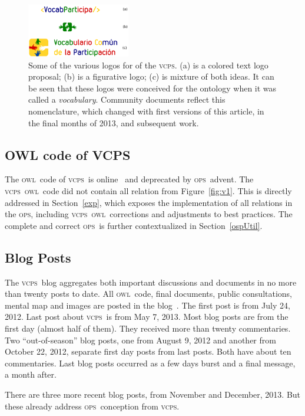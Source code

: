 \documentclass[10pt,letterpaper]{article}
\newcommand{\ops}{\textsc{ops}}
\newcommand{\vcps}{\textsc{vcps}}
\newcommand{\owl}{\textsc{owl}}
\begin{document}
\begin{figure}[!h]
    \centering
    \includegraphics[width=0.4\textwidth]{figs/logoUnificadoDoPDF}
    \caption{Some of the various logos for of the \vcps.
    (a) is a colored text logo proposal; (b) is a figurative logo; (c) is mixture of both ideas.
    It can be seen that these logos were conceived for the ontology when it was called a \emph{vocabulary}.
    Community documents reflect this nomenclature, which changed with first versions of this article,
    in the final months of 2013, and subsequent work.}
    \label{logo}
\end{figure}

\subsection{OWL code of VCPS}\label{owl}
The \owl\ code of \vcps\ is online~\cite{owlVcps} and deprecated by \ops\ advent. 
The \vcps\ \owl\ code did not contain all relation from Figure~\ref{fig:v1}.
This is directly addressed in Section~\ref{exp},
which exposes the implementation of all relations in the \ops,
including \vcps\ \owl\ corrections and adjustments to best practices.
The complete and correct \ops\ is further contextualized in Section~\ref{ospUtil}.

\subsection{Blog Posts}
The \vcps\ blog
aggregates both important discussions and documents in no more than twenty posts to date.
All \owl\ code, final documents, public consultations, mental map and images are posted in the blog~\cite{coraisBlog}. 
The first post is from July 24, 2012.
Last post about \vcps\ is from May 7, 2013.
Most blog posts are from the first day (almost half of them).
They received more than twenty commentaries.
Two ``out-of-season'' blog posts, one from August 9, 2012 and another from October 22, 2012,
separate first day posts from last posts.
Both have about ten commentaries.
Last blog posts occurred as a few days burst and a final message, a month after.

There are three more recent blog posts, from November and December, 2013.
But these already address \ops\ conception from \vcps.
\end{document}
